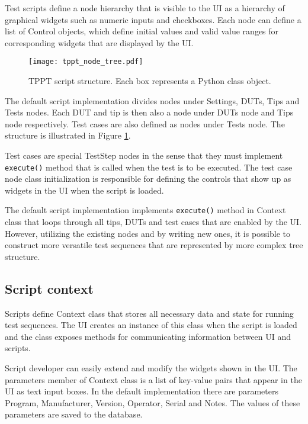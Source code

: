 Test scripts define a node hierarchy that is visible to the UI as a hierarchy of graphical widgets such as numeric inputs and checkboxes. Each node can define a list of Control objects, which define initial values and valid value ranges for corresponding widgets that are displayed by the UI.

\begin{figure}[!h]
	\centering
	\texttt{[image: tppt\_node\_tree.pdf]}
	\caption{TPPT script structure. Each box represents a Python class object.}
	\label{fig:tppt_node_tree}
\end{figure}

The default script implementation divides nodes under Settings, DUTs, Tips and Tests nodes. Each DUT and tip is then also a node under DUTs node and Tips node respectively. Test cases are also defined as nodes under Tests node. The structure is illustrated in Figure \ref{fig:tppt_node_tree}.

Test cases are special TestStep nodes in the sense that they must implement \texttt{execute()} method that is called when the test is to be executed. The test case node class initialization is responsible for defining the controls that show up as widgets in the UI when the script is loaded.

The default script implementation implements \texttt{execute()} method in Context class that loops through all tips, DUTs and test cases that are enabled by the UI. However, utilizing the existing nodes and by writing new ones, it is possible to construct more versatile test sequences that are represented by more complex tree structure.

\subsection{Script context}

Scripts define Context class that stores all necessary data and state for running test sequences. The UI creates an instance of this class when the script is loaded and the class exposes methods for communicating information
between UI and scripts.

Script developer can easily extend and modify the widgets shown in the UI. The parameters member of Context class is a list of key-value pairs that appear in the UI as text input boxes. In the default implementation there are parameters Program, Manufacturer, Version, Operator, Serial and Notes. The values of these parameters are saved to the database.

